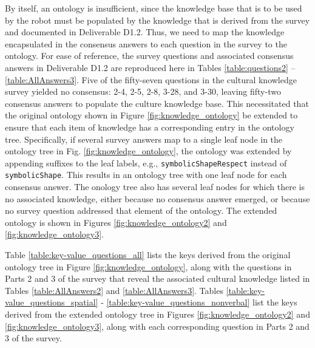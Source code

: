 \documentclass{CSSRforAfrica}
\begin{document}
By itself, an ontology is insufficient, since the knowledge base that is to be used by the robot must be populated by the knowledge that is derived from the survey and documented in Deliverable D1.2.  Thus, we  need to map the knowledge encapsulated in the  consensus answers to each question in the survey to the ontology.  For ease of reference, the survey questions and associated consensus answers in Deliverable D1.2 are reproduced here  in Tables  \ref{table:questions2}  -- \ref{table:AllAnswers3}.  Five of the fifty-seven questions in the cultural knowledge survey  yielded no consensus: 2-4, 2-5,  2-8,   3-28, and 3-30, leaving fifty-two consensus answers to populate the culture knowledge base. This necessitated that the original ontology shown in Figure \ref{fig:knowledge_ontology} be extended to ensure that each item of knowledge has a corresponding entry in the ontology tree. Specifically, if  several survey answers map to a single leaf node in the ontology tree in Fig. \ref{fig:knowledge_ontology}, the ontology was extended by appending suffixes to the leaf labels, e.g., {\small \verb+symbolicShapeRespect+} instead of {\small \verb+symbolicShape+}. This results in an ontology tree with one leaf node for each consensus answer. The onology tree also has several leaf nodes for which there is no associated knowledge, either because no consensus answer emerged, or because no survey question addressed that element of the ontology. The extended ontology is shown in Figures \ref{fig:knowledge_ontology2} and \ref{fig:knowledge_ontology3}.


Table \ref{table:key-value_questions_all} lists the keys  derived from the original ontology tree in Figure \ref{fig:knowledge_ontology}, along with the questions in Parts 2 and 3 of the survey that reveal the associated cultural knowledge listed in Tables  \ref{table:AllAnswers2}  and \ref{table:AllAnswers3}.   
Tables \ref{table:key-value_questions_spatial}  - \ref{table:key-value_questions_nonverbal}  list the keys derived from the extended ontology tree in Figures \ref{fig:knowledge_ontology2} and \ref{fig:knowledge_ontology3}, along with each corresponding question in Parts 2 and 3 of the survey.
 
\end{document}
